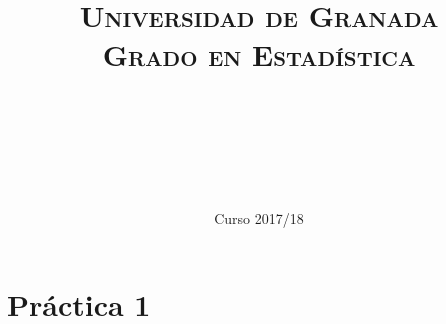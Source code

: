 \documentclass[11pt, a4paper]{article}
\title{
  \normalfont \normalsize 
  \textsc{Universidad de Granada} \\ [25pt]    %
  \textsc{Grado en Estadística} \\ [25pt]    %
  \horrule{0.5pt} \\[0.4cm] %
  \huge \sffamily\subject\\ %
  \horrule{2pt} \\[0.5cm] %
}
\author{\Large\sffamily{\docauthor}}
\date{\vspace{-1.5em} \normalsize \sffamily Curso 2017/18}
\newif\IfInSansMode
\theoremstyle{theorem-style}
\theoremstyle{definition-style}
\theoremstyle{remark-style}
\theoremstyle{example-style}
\begin{document}
\maketitle  %
\vfill
\begin{center}
\end{center}
\newpage
\tableofcontents    %
\newpage



\section{Práctica 1}
\end{document}
